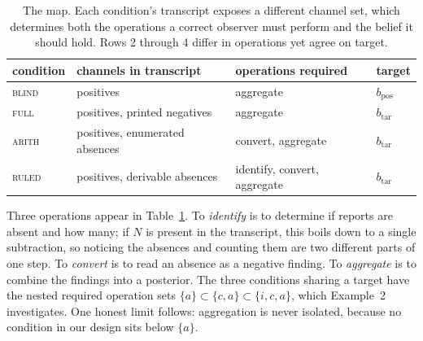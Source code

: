 \documentclass{article}
\theoremstyle{plain}
\theoremstyle{definition}
\theoremstyle{remark}
\newcommand{\bpos}{b_{\mathrm{pos}}}
\newcommand{\btar}{b_{\mathrm{tar}}}         %
\newcommand{\bstar}{\btar}                    %
\newcommand{\cond}[1]{\textsc{#1}}   %
\begin{document}
\begin{table}[t]
  \caption{%
  The map. Each condition's transcript exposes a different channel set, which
  determines both the operations a correct observer must perform and the
  belief it should hold. Rows 2 through 4 differ in operations yet agree on
  target.}
  \label{tab:map}
  \centering
  \small
  \begin{tabular}{llll}
    \toprule
    condition & channels in transcript & operations required & target \\
    \midrule
    \cond{blind} & positives & aggregate & $\bpos$ \\
    \cond{full}           & positives, printed negatives & aggregate & $\bstar$ \\
    \cond{arith}      & positives, enumerated absences & convert, aggregate & $\bstar$ \\
    \cond{ruled} & positives, derivable absences & identify, convert, aggregate & $\bstar$ \\
    \bottomrule
  \end{tabular}
\end{table}

Three operations appear in Table~\ref{tab:map}. To \emph{identify} is to
determine if reports are absent and how many; if $N$ is present in the transcript,
this boils down to a single subtraction, so noticing the absences and 
counting them are two different parts of one step. To \emph{convert} is to read an absence as a
negative finding. To \emph{aggregate} is to combine the findings into a
posterior. The three conditions sharing a target have the nested required operation
sets $\{a\} \subset \{c,a\} \subset \{i,c,a\}$, which Example~2 investigates.
One honest limit follows: aggregation is never isolated,
because no condition in our design sits below $\{a\}$.
\end{document}
